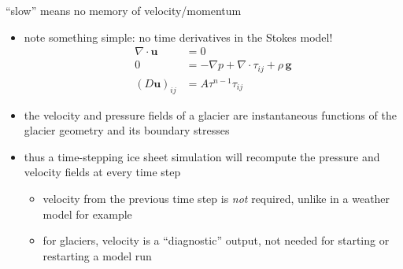 \documentclass[10pt,dvipsnames]{beamer}
\newcommand{\bu}{\mathbf{u}}
\begin{document}
\begin{frame}{``slow'' means no memory of velocity/momentum}

\begin{itemize}
\item note something simple: \alert{no time derivatives} in the Stokes model!
\begin{align*}
\nabla \cdot \bu &= 0 \\
0 &= - \nabla p + \nabla \cdot \tau_{ij} + \rho\, \bm{g} \\
(D\bu)_{ij} &= A \tau^{n-1} \tau_{ij}
\end{align*}
\item the velocity and pressure fields of a glacier are \alert{instantaneous functions} of the glacier geometry and its boundary stresses
\item thus a time-stepping ice sheet simulation will \alert{recompute} the pressure and velocity fields \alert{at every time step}
  \begin{itemize}
  \item[$\circ$] velocity from the previous time step is \emph{not} required, unlike in a weather model for example
  \item[$\circ$] for glaciers, velocity is a ``diagnostic'' output, not needed for starting or restarting a model run
  \end{itemize}
\end{itemize}
\end{frame}
\end{document}
